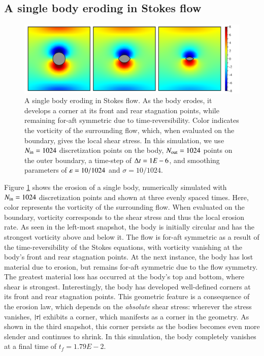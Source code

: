 \documentclass[preprint, 10pt]{elsarticle}
\begin{document}
\subsection{A single body eroding in Stokes flow}

\begin{figure}%
\begin{center}
\includegraphics[width = 0.80 \textwidth]{./figs/01bodseq.pdf}
\caption{A single body eroding in Stokes flow. As the body erodes, it develops a corner at its front and rear stagnation points, while remaining for-aft symmetric due to time-reversibility. Color indicates the vorticity of the surrounding flow, which, when evaluated on the boundary, gives the local shear stress. In this simulation, we use $N_{\mathrm{in}} = 1024$ discretization points on the body, $N_{\mathrm{out}} = 1024$ points on the outer boundary, a time-step of $\Delta t = 1E-6$, and smoothing parameters of $\varepsilon = 10/1024$ and $\sigma = 10/1024$.}
\label{01bodseq} 
\end{center}
\end{figure}

Figure \ref{01bodseq} shows the erosion of a single body, numerically simulated with $N_{\mathrm{in}} = 1024$ discretization points and shown at three evenly spaced times. Here, color represents the vorticity of the surrounding flow. When evaluated on the boundary, vorticity corresponds to the shear stress and thus the local erosion rate. As seen in the left-most snapshot, the body is initially circular and has the strongest vorticity above and below it. The flow is for-aft symmetric as a result of the time-reversibility of the Stokes equations, with vorticity vanishing at the body's front and rear stagnation points. 
At the next instance, the body has lost material due to erosion, but remains for-aft symmetric due to the flow symmetry. The greatest material loss has occurred at the body's top and bottom, where shear is strongest. Interestingly, the body has developed well-defined corners at its front and rear stagnation points. This geometric feature is a consequence of the erosion law, which depends on the {\em absolute} shear stress: wherever the stress vanishes, $\lvert \tau \rvert$ exhibits a corner, which manifests as a corner in the geometry. As shown in the third snapshot, this corner persists as the bodies becomes even more slender and continues to shrink. In this simulation, the body completely vanishes at a final time of $t_f = 1.79E-2$.
\end{document}
